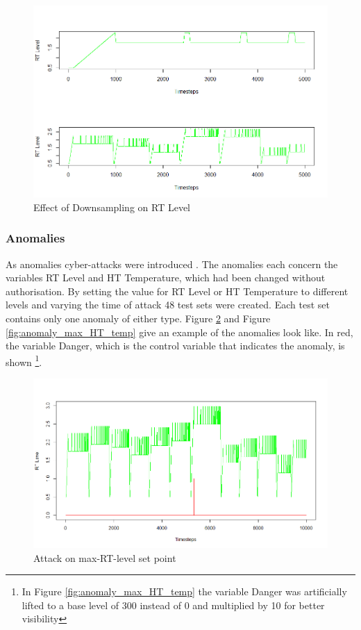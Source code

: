 \begin{figure}[h]
	\centering
	\includegraphics[scale=0.6]{Figures/downsample}
	\decoRule
	\caption[Effect of Downsampling]{Effect of Downsampling on RT Level \parencite{Own}}
	\label{fig:downsample}
\end{figure}

\newpage
\subsubsection{Anomalies} \label{GHL_Anomalies}
As anomalies cyber-attacks were introduced \parencite{Filonov2016}. The anomalies each concern the variables RT Level and HT Temperature, which had been changed without authorisation. By setting the value for RT Level or HT Temperature to different levels and varying the time of attack 48 test sets were created. Each test set contains only one anomaly of either type. Figure \ref{fig:anomaly_max_RT_level} and Figure \ref{fig:anomaly_max_HT_temp} give an example of the anomalies look like. In red, the variable Danger, which is the control variable that indicates the anomaly, is shown \footnote{In Figure \ref{fig:anomaly_max_HT_temp} the variable Danger was artificially lifted to a base level of 300 instead of 0 and multiplied by 10 for better visibility}.

\begin{figure}[h]
	\centering
	\includegraphics[scale=0.4]{Figures/anomaly_max_RT_level}
	\decoRule
	\caption[Attack on max-RT-level set point]{Attack on max-RT-level set point \parencite{Own}}
	\label{fig:anomaly_max_RT_level}
\end{figure}

